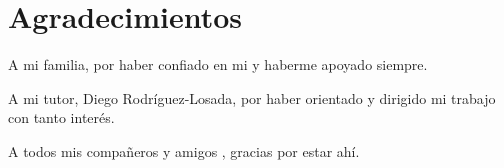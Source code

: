
\chapter{Agradecimientos}

A mi familia, por haber confiado en mi y haberme apoyado siempre.

\vspace{5mm}
\noindent
A mi tutor, Diego Rodríguez-Losada, por haber orientado y dirigido mi trabajo con tanto interés.

\vspace{5mm}
\noindent
A todos mis compañeros y amigos , gracias por estar ahí.